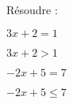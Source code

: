 \documentclass{automatisme}
\begin{document}
\begin{frame}
	Résoudre :

	\setlength{\columnseprule}{1pt}
	\begin{multicols}{4}
		$3x + 2 = 1$ \vspace*{9em}

		\columnbreak

		$3x + 2 > 1$

		\columnbreak

		$-2x + 5 = 7$

		\columnbreak

		$-2x + 5 ≤ 7$
	\end{multicols}
\end{frame}
\end{document}
